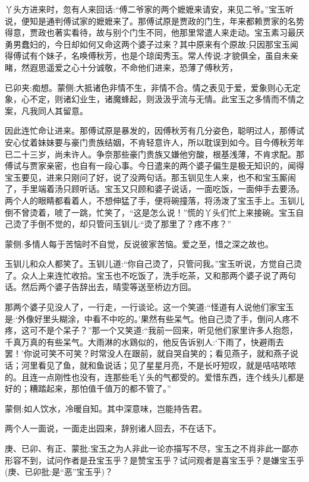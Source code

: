 \begin{parag}
    丫头方进来时，忽有人来回话:“傅二爷家的两个嬷嬷来请安，来见二爷。”宝玉听说，便知是通判傅试家的嬷嬷来了。那傅试原是贾政的门生，年来都赖贾家的名势得意，贾政也著实看待，故与别个门生不同，他那里常遣人来走动。宝玉素习最厌勇男蠢妇的，今日却如何又命这两个婆子过来？其中原来有个原故:只因那宝玉闻得傅试有个妹子，名唤傅秋芳，也是个琼闺秀玉。常人传说:才貌俱全，虽自未亲睹，然遐思遥爱之心十分诚敬，不命他们进来，恐薄了傅秋芳，\begin{note}已卯夹:痴想。蒙侧:大抵诸色非情不生，非情不合。情之表见于爱，爱象则心无定象，心不定，则诸幻业生，诸魔蜂起，则汲汲乎流与无情。此宝玉之多情而不情之案，凡我同人其留意。\end{note}因此连忙命让进来。那傅试原是暴发的，因傅秋芳有几分姿色，聪明过人，那傅试安心仗着妹妹要与豪门贵族结姻，不肯轻意许人，所以耽误到如今。目今傅秋芳年已二十三岁，尚未许人。争奈那些豪门贵族又嫌他穷酸，根基浅薄，不肯求配。那傅试与贾家亲密，也自有一段心事。今日遣来的两个婆子偏生是极无知识的，闻得宝玉要见，进来只刚问了好，说了没两句话。那玉钏见生人来，也不和宝玉厮闹了，手里端着汤只顾听话。宝玉又只顾和婆子说话，一面吃饭，一面伸手去要汤。两个人的眼睛都看着人，不想伸猛了手，便将碗撞落，将汤泼了宝玉手上。玉钏儿倒不曾烫着，唬了一跳，忙笑了，“这是怎么说！”慌的丫头们忙上来接碗。宝玉自己烫了手倒不觉的，却只管问玉钏儿:“烫了那里了？疼不疼？”\begin{note}蒙侧:多情人每于苦恼时不自觉，反说彼家苦恼。爱之至，惜之深之故也。\end{note}玉钏儿和众人都笑了。玉钏儿道:“你自己烫了，只管问我。”宝玉听说，方觉自己烫了。众人上来连忙收拾。宝玉也不吃饭了，洗手吃茶，又和那两个婆子说了两句话。然后两个婆子告辞出去，晴雯等送至桥边方回。
\end{parag}


\begin{parag}
    那两个婆子见没人了，一行走，一行谈论。这一个笑道:“怪道有人说他们家宝玉是:‘外像好里头糊涂，中看不中吃的。’果然有些呆气。他自己烫了手，倒问人疼不疼，这可不是个呆子？”那一个又笑道:“我前一回来，听见他们家里许多人抱怨，千真万真的有些呆气。大雨淋的水鶏似的，他反告诉别人:‘下雨了，快避雨去罢！’你说可笑不可笑？时常没人在跟前，就自哭自笑的；看见燕子，就和燕子说话；河里看见了鱼，就和鱼说话；见了星星月亮，不是长吁短叹，就是咭咭哝哝的。且连一点刚性也没有，连那些毛丫头的气都受的。爱惜东西，连个线头儿都是好的；糟踏起来，那怕值千值万的都不管了。”\begin{note}蒙侧:如人饮水，冷暖自知。其中深意味，岂能持告君。\end{note}两个人一面说，一面走出园来，辞别诸人回去，不在话下。\begin{note}庚、已卯、有正、蒙批:宝玉之为人非此一论亦描写不尽，宝玉之不肖非此一鄙亦形容不到，试问作者是丑宝玉乎？是赞宝玉乎？试问观者是喜宝玉乎？是嫌宝玉乎(庚、已卯批:是“恶”宝玉乎)？\end{note}
\end{parag}


